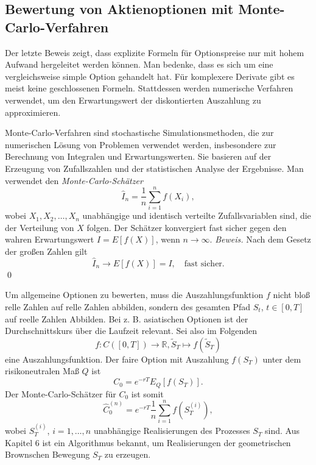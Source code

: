 \subsection{Bewertung von Aktienoptionen mit Monte-Carlo-Verfahren}
Der letzte Beweis zeigt, dass explizite Formeln für Optionspreise nur mit hohem
Aufwand hergeleitet werden können. Man bedenke, dass es sich um eine 
vergleichsweise simple Option gehandelt hat. Für komplexere Derivate
gibt es meist keine geschlossenen Formeln. Stattdessen werden numerische Verfahren
verwendet, um den Erwartungswert der diskontierten Auszahlung zu approximieren.

\begin{defprop}
Monte-Carlo-Verfahren sind stochastische Simulationsmethoden, die zur numerischen
Lösung von Problemen verwendet werden, insbesondere zur Berechnung von Integralen
und Erwartungswerten. Sie basieren auf der Erzeugung von Zufallszahlen und
der statistischen Analyse der Ergebnisse. Man verwendet den \textit{Monte-Carlo-Schätzer}
$$
\hat{I}_n = \frac{1}{n} \sum_{i=1}^n f(X_i),
$$
wobei $X_1, X_2, \ldots, X_n$ unabhängige und identisch verteilte Zufallsvariablen
sind, die der Verteilung von $X$ folgen. Der Schätzer konvergiert fast sicher
gegen den wahren Erwartungswert $I = E[f(X)]$, wenn $n \to \infty$.
\textit{Beweis.} Nach dem Gesetz der großen Zahlen gilt
$$\hat{I}_n \longrightarrow E[f(X)] = I, \quad \text{fast sicher.}$$
\qed
\end{defprop}

\begin{lemma}
Um allgemeine Optionen zu bewerten, muss die Auszahlungsfunktion $f$
nicht bloß relle Zahlen auf relle Zahlen abbilden, sondern des gesamten Pfad
$S_t$, $t\in[0,T]$ auf reelle Zahlen Abbilden. Bei z. B. asiatischen Optionen ist
der Durchschnittskurs über die Laufzeit relevant.
Sei also im Folgenden 
$$f: C([0,T]) \to \mathbb R, \tilde S_T \mapsto f(\tilde S_T)$$
eine Auszahlungsfunktion. Der faire Option mit Auszahlung $f(S_T)$
unter dem risikoneutralen Maß $Q$ ist
$$
C_0 = e^{-rT} E_Q[f(S_T)].
$$
Der Monte-Carlo-Schätzer für $C_0$ ist somit
$$
\hat{C}_0^{(n)} = e^{-rT} \frac{1}{n} \sum_{i=1}^n f(S_T^{(i)}),
$$
wobei $S_T^{(i)}$, $i=1,\ldots,n$ unabhängige Realisierungen des Prozesses $S_T$ sind. Aus Kapitel 6 ist
ein Algorithmus bekannt, um Realisierungen der geometrischen Brownschen Bewegung $S_T$ zu erzeugen.

\end{lemma}

